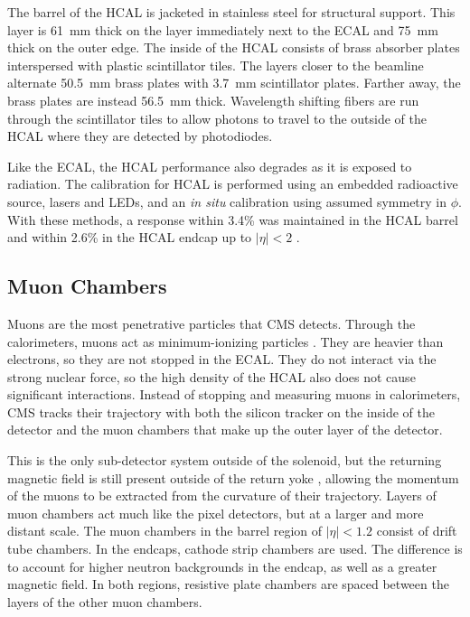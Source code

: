 The barrel of the HCAL is jacketed in stainless steel for structural support.
This layer is \SI{61}{mm} thick on the layer immediately next to the ECAL and
\SI{75}{mm} thick on the outer edge.
The inside of the HCAL consists of brass absorber plates
interspersed with plastic scintillator tiles.
The layers closer to the beamline alternate \SI{50.5}{mm}
brass plates with \SI{3.7}{mm} scintillator plates.
Farther away, the brass plates are instead \SI{56.5}{mm} thick.
Wavelength shifting fibers are run through the scintillator tiles
to allow photons to travel to the outside of the HCAL where they are detected by photodiodes.

Like the ECAL, the HCAL performance also degrades as it is exposed to radiation.
The calibration for HCAL is performed using an embedded radioactive source,
lasers and LEDs, and an \emph{in situ} calibration using assumed symmetry in $\phi$.
With these methods, a response within 3.4\% was maintained in the HCAL barrel
and within 2.6\% in the HCAL endcap up to $|\eta| < 2$ \cite{Chadeeva_2018}.

\subsection{Muon Chambers}

Muons are the most penetrative particles that CMS detects.
Through the calorimeters, muons act as minimum-ionizing particles \cite{James:927392}.
They are heavier than electrons, so they are not stopped in the ECAL.
They do not interact via the strong nuclear force,
so the high density of the HCAL also does not cause significant interactions.
Instead of stopping and measuring muons in calorimeters,
CMS tracks their trajectory with both the silicon tracker on the inside of the detector
and the muon chambers that make up the outer layer of the detector.

This is the only sub-detector system outside of the solenoid,
but the returning magnetic field is still present outside of the return yoke
\cite{828264,Klyukhin:2062915},
allowing the momentum of the muons to be extracted from the curvature of their trajectory.
Layers of muon chambers act much like the pixel detectors,
but at a larger and more distant scale.
The muon chambers in the barrel region of $|\eta| < 1.2$ consist of drift tube chambers.
In the endcaps, cathode strip chambers are used.
The difference is to account for higher neutron backgrounds in the endcap,
as well as a greater magnetic field.
In both regions, resistive plate chambers are spaced
between the layers of the other muon chambers.

